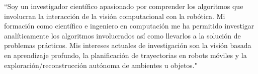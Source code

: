 ``Soy un investigador científico apasionado por comprender los algoritmos que involucran la interacción de la visión computacional con la robótica. Mi formación como científico e ingeniero en computación me ha permitido investigar analíticamente los algoritmos involucrados así como llevarlos a la solución de problemas prácticos. Mis intereses actuales de investigación son la visión basada en aprendizaje profundo, la planificación de trayectorias en robots móviles y la exploración/reconstrucción autónoma de ambientes u objetos."
